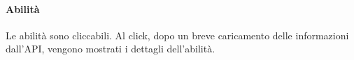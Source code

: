 \documentclass[a4paper,11pt]{article}
\begin{document}
\paragraph{Abilità}
Le abilità sono cliccabili. Al click, dopo un breve caricamento delle informazioni dall’API, vengono mostrati i dettagli dell’abilità.\\
\begin{figure}[h!]
\end{figure}
\end{document}
